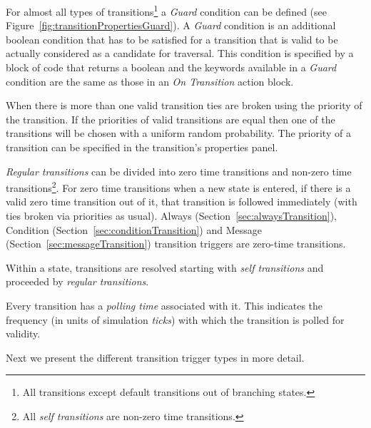 \documentclass[11pt]{amsart}
\begin{document}
For almost all types of transitions\footnote{All transitions except default transitions out of branching states.} a \emph{Guard} condition can be defined (see Figure~\ref{fig:transitionPropertiesGuard}). A \emph{Guard} condition is an additional boolean condition that has to be satisfied for a transition that is valid to be actually considered as a candidate for traversal. This condition is specified by a block of code that returns a boolean and the keywords available in a \emph{Guard} condition are the same as those in an \emph{On Transition} action block.

When there is more than one valid transition ties are broken using the priority of the transition. If the priorities of valid transitions are equal then one of the transitions will be chosen with a uniform random probability. The priority of a transition can be specified in the transition's properties panel.

\emph{Regular transitions} can be divided into zero time transitions and non-zero time transitions\footnote{All \emph{self transitions} are non-zero time transitions.}. For zero time transitions when a new state is entered, if there is a valid zero time transition out of it, that transition is followed immediately (with ties broken via priorities as usual). Always (Section~\ref{sec:alwaysTransition}), Condition (Section~\ref{sec:conditionTransition}) and Message (Section~\ref{sec:messageTransition}) transition triggers are zero-time transitions.

Within a state, transitions are resolved starting with \emph{self transitions} and proceeded by \emph{regular transitions}.

Every transition has a \emph{polling time} associated with it. This indicates the frequency (in units of simulation \emph{ticks}) with which the transition is polled for validity.

Next we present the different transition trigger types in more detail.
\end{document}
